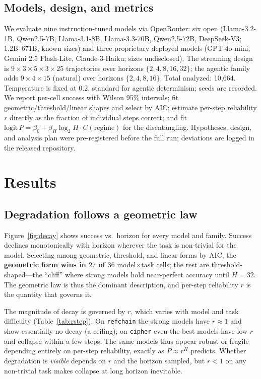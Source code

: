 \documentclass[11pt]{article}
\newcommand{\rstep}{r}
\newcommand{\horizon}{H}
\begin{document}
\subsection{Models, design, and metrics}
We evaluate nine instruction-tuned models via OpenRouter: six open
(Llama-3.2-1B, Qwen2.5-7B, Llama-3.1-8B, Llama-3.3-70B, Qwen2.5-72B, DeepSeek-V3;
1.2B--671B, known sizes) and three proprietary deployed models (GPT-4o-mini, Gemini
2.5 Flash-Lite, Claude-3-Haiku; sizes undisclosed). The streaming design is
$9\times3\times5\times3\times25$ trajectories over horizons $\{2,4,8,16,32\}$; the
agentic family adds $9\times4\times15$ (natural) over horizons $\{2,4,8,16\}$. Total
analyzed: 10{,}664. Temperature is fixed at $0.2$, standard for agentic determinism;
seeds are recorded. We report per-cell success with Wilson 95\% intervals; fit
geometric/threshold/linear shapes and select by AIC; estimate per-step reliability
$\rstep$ directly as the fraction of individual steps correct; and fit
$\mathrm{logit}\,P=\beta_0+\beta_H\log_2\!\horizon\cdot C(\text{regime})$ for the
disentangling. Hypotheses, design, and analysis plan were pre-registered before the
full run; deviations are logged in the released repository.

\section{Results}
\subsection{Degradation follows a geometric law}\label{sec:law}
Figure~\ref{fig:decay} shows success vs.\ horizon for every model and family. Success
declines monotonically with horizon wherever the task is non-trivial for the model.
Selecting among geometric, threshold, and linear forms by AIC, the \textbf{geometric
form wins in $27$ of $36$} model$\times$task cells; the rest are threshold-shaped---the
``cliff'' where strong models hold near-perfect accuracy until $\horizon{=}32$. The
geometric law is thus the dominant description, and per-step reliability $\rstep$ is the
quantity that governs it.

The magnitude of decay is governed by $\rstep$, which varies with model and task
difficulty (Table~\ref{tab:rstep}). On \texttt{refchain} the strong models have
$\rstep\!\approx\!1$ and show essentially no decay (a ceiling); on \texttt{cipher} even
the best models have low $\rstep$ and collapse within a few steps. The same models thus
appear robust or fragile depending entirely on per-step reliability, exactly as
$P\approx \rstep^{\horizon}$ predicts. Whether degradation is \emph{visible} depends on
$\rstep$ and the horizon sampled, but $\rstep<1$ on any non-trivial task makes collapse
at long horizon inevitable.
\end{document}
